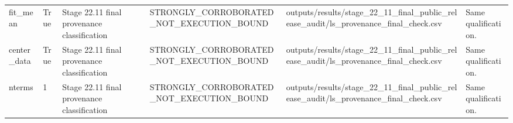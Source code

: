 \begin{longtable}{llllll}
fit\_mean & True & Stage 22.11 final provenance classification & STRONGLY\_CORROBORATED\_NOT\_EXECUTION\_BOUND & outputs/results/stage\_22\_11\_final\_public\_release\_audit/ls\_provenance\_final\_check.csv & Same qualification. \\
center\_data & True & Stage 22.11 final provenance classification & STRONGLY\_CORROBORATED\_NOT\_EXECUTION\_BOUND & outputs/results/stage\_22\_11\_final\_public\_release\_audit/ls\_provenance\_final\_check.csv & Same qualification. \\
nterms & 1 & Stage 22.11 final provenance classification & STRONGLY\_CORROBORATED\_NOT\_EXECUTION\_BOUND & outputs/results/stage\_22\_11\_final\_public\_release\_audit/ls\_provenance\_final\_check.csv & Same qualification. \\
\bottomrule
\end{longtable}
